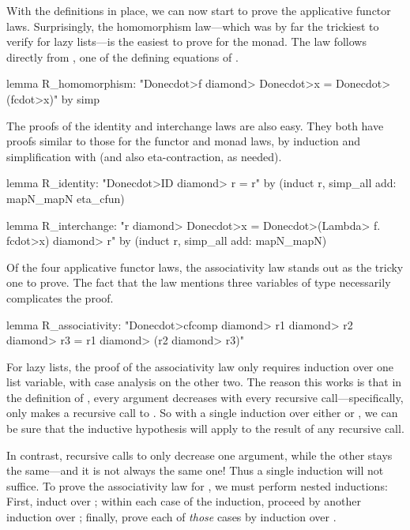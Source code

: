 With the definitions in place, we can now start to prove the applicative functor laws. Surprisingly, the homomorphism law---which was by far the trickiest to verify for lazy lists---is the easiest to prove for the  monad. The law follows directly from , one of the defining equations of .

\begin{isacode}
lemma R_homomorphism: "Done\<cdot>f \<diamond> Done\<cdot>x = Done\<cdot>(f\<cdot>x)"
  by simp
\end{isacode}

The proofs of the identity and interchange laws are also easy. They both have proofs similar to those for the functor and monad laws, by induction and simplification with  (and also eta-contraction, as needed).

\begin{isacode}
lemma R_identity: "Done\<cdot>ID \<diamond> r = r"
  by (induct r, simp_all add: mapN_mapN eta_cfun)
\end{isacode}
\unmedskip
{}
\begin{isacode}
lemma R_interchange: "r \<diamond> Done\<cdot>x = Done\<cdot>(\<Lambda> f. f\<cdot>x) \<diamond> r"
  by (induct r, simp_all add: mapN_mapN)
\end{isacode}

Of the four applicative functor laws, the associativity law stands out as the tricky one to prove. The fact that the law mentions three variables of type  necessarily complicates the proof.
%
\begin{isacode}
lemma R_associativity: "Done\<cdot>cfcomp \<diamond> r1 \<diamond> r2 \<diamond> r3 = r1 \<diamond> (r2 \<diamond> r3)"
\end{isacode}
%
For lazy lists, the proof of the associativity law only requires induction over one list variable, with case analysis on the other two. The reason this works is that in the definition of , every argument decreases with every recursive call---specifically,  only makes a recursive call to . So with a single induction over either  or , we can be sure that the inductive hypothesis will apply to the result of any recursive call.

In contrast, recursive calls to  only decrease one argument, while the other stays the same---and it is not always the same one! Thus a single induction will not suffice. To prove the associativity law for , we must perform nested inductions: First, induct over ; within each case of the induction, proceed by another induction over ; finally, prove each of \emph{those} cases by induction over .

